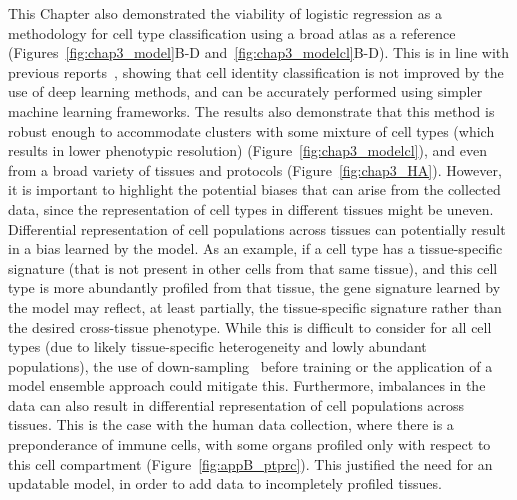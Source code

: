 This Chapter also demonstrated the viability of logistic regression as a methodology for cell type classification using a broad atlas as a reference (Figures~\ref{fig:chap3_model}B-D and~\ref{fig:chap3_modelcl}B-D). This is in line with previous reports~\citep{kohler_deep_2019,abdelaal_comparison_2019}, showing that cell identity classification is not improved by the use of deep learning methods, and can be accurately performed using simpler machine learning frameworks. The results also demonstrate that this method is robust enough to accommodate clusters with some mixture of cell types (which results in lower phenotypic resolution) (Figure~\ref{fig:chap3_modelcl}), and even from a broad variety of tissues and protocols (Figure~\ref{fig:chap3_HA}). However, it is important to highlight the potential biases that can arise from the collected data, since the representation of cell types in different tissues might be uneven. Differential representation of cell populations across tissues can potentially result in a bias learned by the model. As an example, if a cell type has a tissue-specific signature (that is not present in other cells from that same tissue), and this cell type is more abundantly profiled from that tissue, the gene signature learned by the model may reflect, at least partially, the tissue-specific signature rather than the desired cross-tissue phenotype. While this is difficult to consider for all cell types (due to likely tissue-specific heterogeneity and lowly abundant populations), the use of down-sampling~\citep{wong_understanding_2016,hie_geometric_2019} before training or the application of a model ensemble approach could mitigate this. Furthermore, imbalances in the data can also result in differential representation of cell populations across tissues.  This is the case with the human data collection, where there is a preponderance of immune cells, with some organs profiled only with respect to this cell compartment (Figure~\ref{fig:appB_ptprc}). This justified the need for an updatable model, in order to add data to incompletely profiled tissues.

